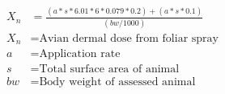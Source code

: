 \documentclass[fleqn, oneside, 11pt]{article}%
\begin{document}
\begin{preview}
\begin{align*}%
X_{n} & = \frac{\left(a*s*6.01*6*0.079*0.2\right)+\left(a*s*0.1\right)}{\left(bw/1000\right)} \nonumber \\
X_{n} & =  \text{Avian dermal dose from foliar spray} \nonumber \\
a & =  \text{Application rate} \nonumber \\
s & =  \text{Total surface area of animal} \nonumber \\
bw & =  \text{Body weight of assessed animal} \nonumber \\
\end{align*} 
\end{preview}
\end{document}
